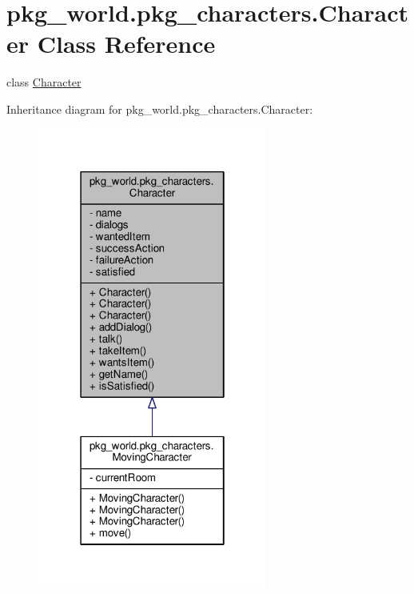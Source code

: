 \hypertarget{classpkg__world_1_1pkg__characters_1_1Character}{\section{pkg\-\_\-world.\-pkg\-\_\-characters.\-Character Class Reference}
\label{classpkg__world_1_1pkg__characters_1_1Character}
}


class \hyperlink{classpkg__world_1_1pkg__characters_1_1Character}{Character}  




Inheritance diagram for pkg\-\_\-world.\-pkg\-\_\-characters.\-Character\-:
\nopagebreak
\begin{figure}[H]
\begin{center}
\leavevmode
\includegraphics[width=214pt]{classpkg__world_1_1pkg__characters_1_1Character__inherit__graph}
\end{center}
\end{figure}


